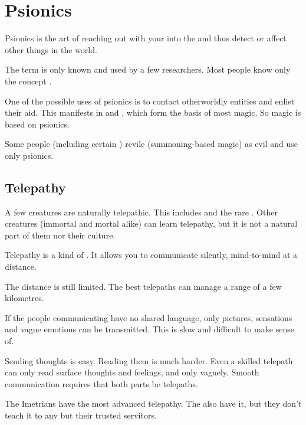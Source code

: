 \section{Psionics}
Psionics is the art of reaching out with your  into the  and thus detect or affect other things in the world. 

The term  is only known and used by a few researchers. 
Most people know only the concept . 

One of the possible uses of psionics is to contact otherworldly entities and enlist their aid. 
This manifests in  and , which form the basis of most magic. 
So magic is based on psionics. 

Some people (including certain ) revile  (summoning-based magic) as evil and use only psionics. 









\subsection{Telepathy}
A few creatures are naturally telepathic. 
This includes  and the rare  \scathae. 
Other creatures (immortal and mortal alike) can learn telepathy, but it is not a natural part of them nor their culture. 

Telepathy is a kind of . 
It allows you to communicate silently, mind-to-mind at a distance. 

The distance is still limited. 
The best telepaths can manage a range of a few kilometres. 

If the people communicating have no shared language, only pictures, sensations and vague emotions can be transmitted. This is slow and difficult to make sense of. 

Sending thoughts is easy. 
Reading them is much harder. 
Even a skilled telepath can only read surface thoughts and feelings, and only vaguely. 
Smooth communication requires that both parts be telepaths. 

The Imetrians have the most advanced telepathy. 
The \banes{} also have it, but they don't teach it to any but their trusted servitors. 















